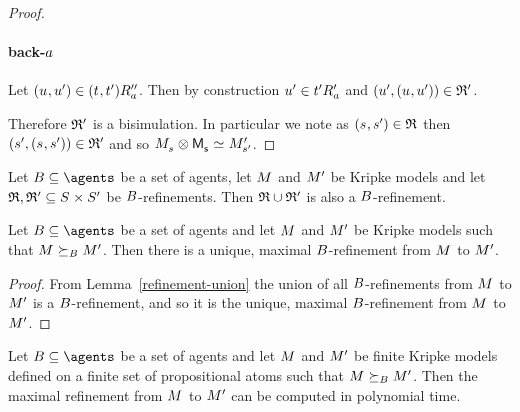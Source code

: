 \begin{proof}
\paragraph{back-$a$}
Let $(\kStateU, \kStateUP) \in \kSuccessorsPPA{(\kStateT, \kStateTP)}$.
Then by construction ${u}^{\prime} \in {{t}^{\prime}} {R^{\prime}_{a}}$ and $(\kStateUP, (\kStateU, \kStateUP)) \in \bisimulation'$.

Therefore $\mathfrak{R}'$ is a bisimulation.
In particular we note as $(\kStateS, \kStateSP) \in \refinement$ then $(\kStateSP, (\kStateS, \kStateSP)) \in \bisimulation'$ and so $\kPModel{\kStateS} \exec \aPModel{\aStateS} \bisimilar \kPModelP{\kStateSP}$.
\end{proof}

\begin{lemma}\label{refinement-union}
Let $\agentsB \subseteq \agents$ be a set of agents, let $\kModel$ and ${M^{\prime}_{}}$ be Kripke models and let $\refinement, \refinement' \subseteq \kStates \times \kStatesP$ be $B$-refinements.
Then $\mathfrak{R} \cup \mathfrak{R}'$ is also a $B$-refinement.
\end{lemma}

\begin{proposition}
Let $\agentsB \subseteq \agents$ be a set of agents and let $\kModel$ and ${M^{\prime}_{}}$ be Kripke models such that $\kModel \simulatesBs \kModelP$.
Then there is a unique, maximal $B$-refinement from $\kModel$ to ${M^{\prime}_{}}$.
\end{proposition}

\begin{proof}
From Lemma~\ref{refinement-union} the union of all $B$-refinements from $\kModel$ to ${M^{\prime}_{}}$ is a $B$-refinement, and so it is the unique, maximal $B$-refinement from $\kModel$ to ${M^{\prime}_{}}$.
\end{proof}

\begin{proposition}
Let $\agentsB \subseteq \agents$ be a set of agents and let $\kModel$ and ${M^{\prime}_{}}$ be finite Kripke models defined on a finite set of propositional atoms such that $\kModel \simulatesBs \kModelP$.
Then the maximal refinement from $\kModel$ to ${M^{\prime}_{}}$ can be computed in polynomial time.
\end{proposition}

